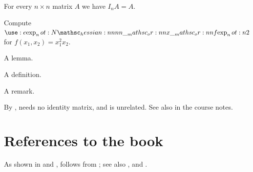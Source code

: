 \documentclass{article}
\begin{document}
\begin{proposition}[Identity]\label{prop:id}
  For every $n \times n$ matrix $A$ we have $I_n A = A$.
\end{proposition}
\begin{exercise}\label{ex:hess}
  Compute $\hessian*{2}$ for $f(x_1, x_2) = x_1^2 x_2$.
\end{exercise}
\begin{lemma}\label{lem:a} A lemma. \end{lemma}
\begin{definition} A definition. \end{definition}
\begin{remark} A remark. \end{remark}
By ,  needs no identity matrix,
and  is unrelated.
See also  in the course notes.

\section*{References to the book}
As shown in  and ,  follows
from ; see also ,  and .
\end{document}
